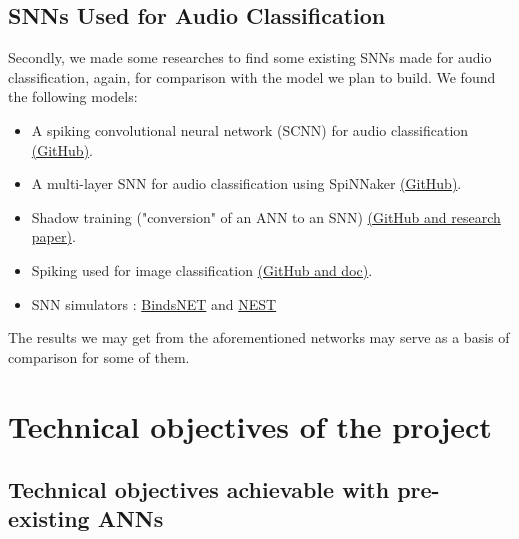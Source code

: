 \documentclass[11pt]{article}
\begin{document}
\subsection{SNNs Used for Audio Classification}

Secondly, we made some researches to find some existing SNNs made for audio classification, again, for comparison with the model we plan to build.
We found the following models:
\begin{itemize}
  \item A spiking convolutional neural network (SCNN) for audio classification \hyperref[item:SCNN-audio-classification]{(GitHub)}.
  \item A multi-layer SNN for audio classification using SpiNNaker \hyperref[item:spinnaker-audio-classification]{(GitHub)}.
  \item Shadow training ("conversion" of an ANN to an SNN) \hyperref[item:shadow-training]{(GitHub and research paper)}.
  \item Spiking used for image classification \hyperref[item:stereospike]{(GitHub and doc)}.
  \item SNN simulators : \href{item:bindsNET_snntorch-lib}{BindsNET} and \href{item:nest_snntorch-lib}{NEST}
\end{itemize}

The results we may get from the aforementioned networks may serve as a basis of comparison for some of them.

\section{Technical objectives of the project}
\subsection{Technical objectives achievable with pre-existing ANNs}
\end{document}
